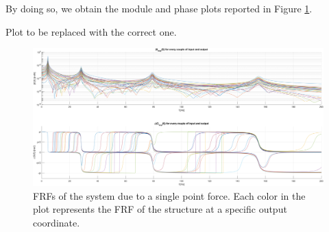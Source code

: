 By doing so, we obtain the module and phase plots reported in Figure \ref{fig:FRFs_single_point_force}.

\begin{center}
    \huge{Plot to be replaced with the correct one.}
\end{center}

\begin{figure}[H]
    \centering
    \includegraphics[width=\textwidth]{img/MATLAB/Part_A/Experimental_FRF_couple_all.png}
    \caption{FRFs of the system due to a single point force. Each color in the plot represents the FRF of the structure at a specific output coordinate.}
    \label{fig:FRFs_single_point_force}
\end{figure}
